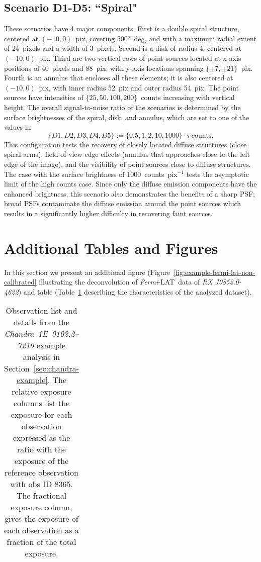 \documentclass[twocolumn, lineno]{aastex631}
\newcommand{\chandra}{\textit{Chandra}~}
\newcommand{\fermi}{\textit{Fermi}-LAT~}
\begin{document}
    \subsection{Scenario D1-D5: ``Spiral"}
    These scenarios have 4 major components. First is a double spiral structure, centered at $(-10, 0)$~pix, covering 500$^o$~deg, and with a maximum radial extent of 24~pixels and a width of 3~pixels. Second is a disk of radius 4, centered at $(-10, 0)$~pix.  Third are two vertical rows of point sources located at x-axis positions of 40~pixels and 88~pix, with y-axis locations spanning $\{\pm7,\pm21\}$~pix. Fourth is an annulus that encloses all these elements; it is also centered at $(-10, 0)$~pix, with inner radius 52~pix and outer radius 54~pix.  
    The point sources have intensities of $\{25, 50, 100, 200\}$~counts increasing with vertical height. The overall signal-to-noise ratio of the scenarios is determined by the surface brightnesses of the spiral, disk, and annulus, which are set to one of the values in 
    $$\{D1, D2, D3, D4, D5 \} := \{0.5, 1, 2, 10, 1000\} \cdot \tau ~\textrm{counts}.$$  
    This configuration tests the recovery of closely located diffuse structures (close spiral arms), field-of-view edge effects (annulus that approaches close to the left edge of the image), and the visibility of point sources close to diffuse structures.  The case with the surface brightness of 1000~counts~pix$^{-1}$ tests the asymptotic limit of the high counts case.  Since only the diffuse emission components have the enhanced brightness, this scenario also demonstrates the benefits of a sharp PSF; broad PSFs contaminate the diffuse emission around the point sources which results in a significantly higher difficulty in recovering faint sources.
    
    \section{Additional Tables and Figures}    
    In this section we present an additional figure (Figure~\ref{fig:example-fermi-lat-non-calibrated} illustrating the deconvolution of \fermi data of \textit{RX J0852.0-4622}) and table (Table~\ref{tab:chandra_obs} describing the characteristics of the analyzed dataset).
    
    \label{sec:chandra-table}
    \begin{table}
    \centering
        \begin{tabular}{ c c c c c }
            
        \end{tabular}
        \label{tab:chandra_obs}
        \caption{Observation list and details from the \chandra \textit{1E~0102.2–7219} example analysis in Section~\ref{sec:chandra-example}. The relative exposure columns list the exposure for each observation expressed as the ratio with the exposure of the reference observation with obs ID 8365. The fractional exposure column, gives the exposure of each observation as a fraction of the total exposure.}
    \end{table}
\end{document}
